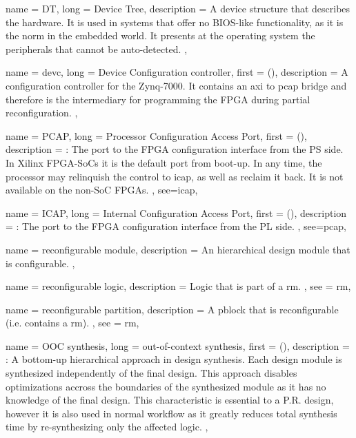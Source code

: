 {
	name = {DT},
	long = {Device Tree},
	description = {
		A device structure that describes the hardware.
		It is used in systems that offer no BIOS-like functionality,
		as it is the norm in the embedded world. It presents 
		at the operating system the peripherals that cannot be auto-detected.
	},
}

{
	name = {devc},
	long = {Device Configuration controller},
	first = { ()},
	description = {
		A configuration controller for the Zynq-7000.
		It contains an \gls{axi} to \gls{pcap} bridge
		and therefore is the intermediary
		for programming the FPGA during partial reconfiguration.
	},
}

{
	name = {PCAP},
	long = {Processor Configuration Access Port},
	first = { ()},
	description = {\emph{}:
		The port to the FPGA configuration interface from the PS side.
		In Xilinx FPGA-SoCs it is the default port from boot-up.
		In any time, the processor may relinquish the control to \gls{icap},
		as well as reclaim it back. It is not available on the non-SoC FPGAs.
	},
	see={icap},
}


{
	name = {ICAP},
	long = {Internal Configuration Access Port},
	first = { ()},
	description = {\emph{}:
		The port to the FPGA configuration interface from the PL side.
	},
	see={pcap},
}


{
	name = {reconfigurable module},
	description = {
		An hierarchical design module that is configurable.
	},
}


{
	name = {reconfigurable logic},
	description = {
		Logic that is part of a \gls{rm}.
	},
	see = {rm},
}


{
	name = {reconfigurable partition},
	description = {
		A \gls{pblock} that is reconfigurable (i.e. contains a \gls{rm}).
	},
	see = {rm},
}


{
	name = {OOC synthesis},
	long = {out-of-context synthesis},
	first = { ()},
	description = {\emph{}:
		A bottom-up hierarchical approach in design synthesis. 
		Each design module is synthesized independently of the final design.
		This approach disables optimizations accross the boundaries of the
		synthesized module as it has no knowledge of the final design.
		This characteristic is essential to a P.R. design, however it is also
		used in normal workflow as it greatly reduces total synthesis time by
		re-synthesizing only the affected logic.
	},
}

